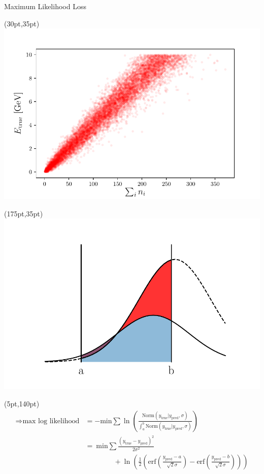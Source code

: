 \documentclass[10pt]{beamer}
\begin{document}
\begin{frame}{Maximum Likelihood Loss}
  \begin{textblock*}{150pt}(30pt,35pt)
      \includegraphics[width=\textwidth]{../images/e-vs-sum_n.pdf}
  \end{textblock*}
  \begin{textblock*}{150pt}(175pt,35pt)
    \includegraphics[width=\textwidth]{../images/gaussian_shift.pdf}
  \end{textblock*}

  \begin{textblock*}{150pt}(5pt,140pt)
    \begin{align*}
      \Rightarrow \text{max log likelihood} &= -\text{min} \sum \ln(\frac{\text{Norm}(y_{\text{true}} | y_{\text{pred}}, \sigma)}{\int^b_a \text{Norm}(y_{\text{true}} | y_{\text{pred}}, \sigma)})\\
                                            &=\ \text{min} \sum \frac{(y_{\text{true}}-y_{\text{pred}})^2}{2 \sigma^2}\\
   &\qquad \qquad +\ln(\frac{1}{2} \left(\text{erf}(\frac{y_{\text{pred}}-a}{\sqrt{2}\sigma}) - \text{erf}(\frac{y_{\text{pred}}-b}{\sqrt{2}\sigma})\right))
    \end{align*}
  \end{textblock*}
\end{frame}
\end{document}
